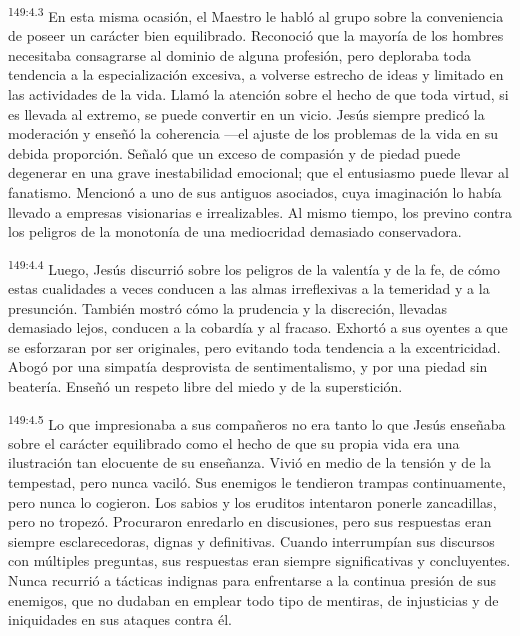 \par
\textsuperscript{149:4.3} En esta misma ocasión, el Maestro le habló al grupo sobre la conveniencia de poseer un carácter bien equilibrado. Reconoció que la mayoría de los hombres necesitaba consagrarse al dominio de alguna profesión, pero deploraba toda tendencia a la especialización excesiva, a volverse estrecho de ideas y limitado en las actividades de la vida. Llamó la atención sobre el hecho de que toda virtud, si es llevada al extremo, se puede convertir en un vicio. Jesús siempre predicó la moderación y enseñó la coherencia ---el ajuste de los problemas de la vida en su debida proporción. Señaló que un exceso de compasión y de piedad puede degenerar en una grave inestabilidad emocional; que el entusiasmo puede llevar al fanatismo. Mencionó a uno de sus antiguos asociados, cuya imaginación lo había llevado a empresas visionarias e irrealizables. Al mismo tiempo, los previno contra los peligros de la monotonía de una mediocridad demasiado conservadora.

\par
\textsuperscript{149:4.4} Luego, Jesús discurrió sobre los peligros de la valentía y de la fe, de cómo estas cualidades a veces conducen a las almas irreflexivas a la temeridad y a la presunción. También mostró cómo la prudencia y la discreción, llevadas demasiado lejos, conducen a la cobardía y al fracaso. Exhortó a sus oyentes a que se esforzaran por ser originales, pero evitando toda tendencia a la excentricidad. Abogó por una simpatía desprovista de sentimentalismo, y por una piedad sin beatería. Enseñó un respeto libre del miedo y de la superstición.

\par
\textsuperscript{149:4.5} Lo que impresionaba a sus compañeros no era tanto lo que Jesús enseñaba sobre el carácter equilibrado como el hecho de que su propia vida era una ilustración tan elocuente de su enseñanza. Vivió en medio de la tensión y de la tempestad, pero nunca vaciló. Sus enemigos le tendieron trampas continuamente, pero nunca lo cogieron. Los sabios y los eruditos intentaron ponerle zancadillas, pero no tropezó. Procuraron enredarlo en discusiones, pero sus respuestas eran siempre esclarecedoras, dignas y definitivas. Cuando interrumpían sus discursos con múltiples preguntas, sus respuestas eran siempre significativas y concluyentes. Nunca recurrió a tácticas indignas para enfrentarse a la continua presión de sus enemigos, que no dudaban en emplear todo tipo de mentiras, de injusticias y de iniquidades en sus ataques contra él.

